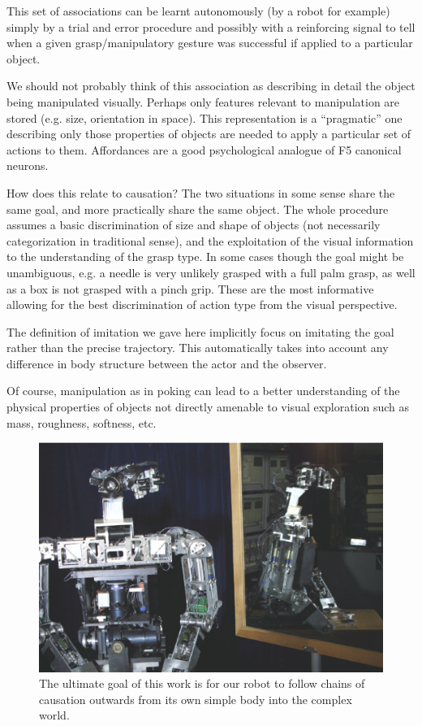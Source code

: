 This set of associations can be learnt autonomously (by a robot for
example) simply by a trial and error procedure and possibly with a
reinforcing signal to tell when a given grasp/manipulatory gesture was
successful if applied to a particular object.

We should not probably think of this association as describing in
detail the object being manipulated visually. Perhaps only features
relevant to manipulation are stored (e.g. size, orientation in space).
This representation is a ``pragmatic'' one describing only those
properties of objects are needed to apply a particular set of actions
to them. Affordances are a good psychological analogue of F5
canonical neurons.
\fi


\ifverbose
How does this relate to causation?  The two situations in some sense
share the same goal, and more practically share the same object.  The
whole procedure assumes a basic discrimination of size and shape of
objects (not necessarily categorization in traditional sense), and the
exploitation of the visual information to the understanding of the
grasp type. In some cases though the goal might be unambiguous, e.g. a
needle is very unlikely grasped with a full palm grasp, as well as a
box is not grasped with a pinch grip. These are the most informative
allowing for the best discrimination of action type from the visual
perspective.
\fi

\ifverbose
The definition of imitation we gave here implicitly focus on imitating
the goal rather than the precise trajectory. This automatically takes
into account any difference in body structure between the actor and
the observer.

Of course, manipulation as in poking can lead to a better
understanding of the physical properties of objects not directly
amenable to visual exploration such as mass, roughness, softness, etc.
\fi

\ifverbose
\begin{figure}[tbh]
\begin{center}
\includegraphics[width=\columnwidth]{mirror-cog.eps}
\caption{ 
\label{fig:mirror-cog}
%
The ultimate goal of this work is for our robot to follow chains of
causation outwards from its own simple body into the complex world.
%
}
\end{center}
\end{figure}
\fi
